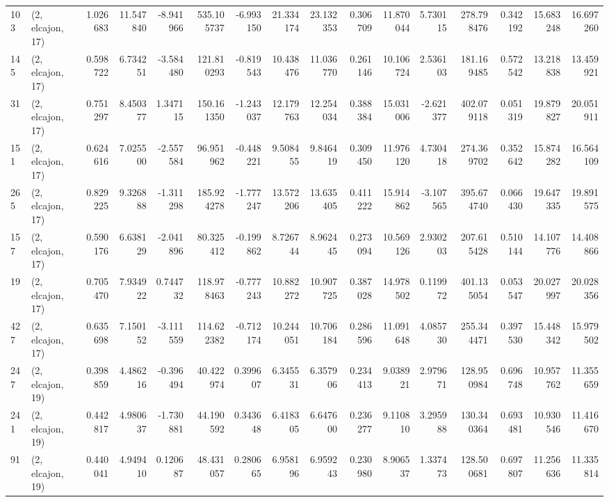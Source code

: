\begin{tabular}{llrrrrrrrrrrrrrr}
103 &  (2, elcajon, 17) &   1.026683 &  11.547840 &  -8.941966 &   535.105737 &  -6.993150 &  21.334174 &  23.132353 &  0.306709 &  11.870044 &   5.730115 &   278.798476 &   0.342192 &  15.683248 &  16.697260 \\
145 &  (2, elcajon, 17) &   0.598722 &   6.734251 &  -3.584480 &   121.810293 &  -0.819543 &  10.438476 &  11.036770 &  0.261146 &  10.106724 &   2.536103 &   181.169485 &   0.572542 &  13.218838 &  13.459921 \\
31  &  (2, elcajon, 17) &   0.751297 &   8.450377 &   1.347115 &   150.161350 &  -1.243037 &  12.179763 &  12.254034 &  0.388384 &  15.031006 &  -2.621377 &   402.079118 &   0.051319 &  19.879827 &  20.051911 \\
151 &  (2, elcajon, 17) &   0.624616 &   7.025500 &  -2.557584 &    96.951962 &  -0.448221 &   9.508455 &   9.846419 &  0.309450 &  11.976120 &   4.730418 &   274.369702 &   0.352642 &  15.874282 &  16.564109 \\
265 &  (2, elcajon, 17) &   0.829225 &   9.326888 &  -1.311298 &   185.924278 &  -1.777247 &  13.572206 &  13.635405 &  0.411222 &  15.914862 &  -3.107565 &   395.674740 &   0.066430 &  19.647335 &  19.891575 \\
157 &  (2, elcajon, 17) &   0.590176 &   6.638129 &  -2.041896 &    80.325412 &  -0.199862 &   8.726744 &   8.962445 &  0.273094 &  10.569126 &   2.930203 &   207.615428 &   0.510144 &  14.107776 &  14.408866 \\
19  &  (2, elcajon, 17) &   0.705470 &   7.934922 &   0.744732 &   118.978463 &  -0.777243 &  10.882272 &  10.907725 &  0.387028 &  14.978502 &   0.119972 &   401.135054 &   0.053547 &  20.027997 &  20.028356 \\
427 &  (2, elcajon, 17) &   0.635698 &   7.150152 &  -3.111559 &   114.622382 &  -0.712174 &  10.244051 &  10.706184 &  0.286596 &  11.091648 &   4.085730 &   255.344471 &   0.397530 &  15.448342 &  15.979502 \\
247 &  (2, elcajon, 19) &   0.398859 &   4.486216 &  -0.396494 &    40.422974 &   0.399607 &   6.345531 &   6.357906 &  0.234413 &   9.038921 &   2.979671 &   128.950984 &   0.696748 &  10.957762 &  11.355659 \\
241 &  (2, elcajon, 19) &   0.442817 &   4.980637 &  -1.730881 &    44.190592 &   0.343648 &   6.418305 &   6.647600 &  0.236277 &   9.110810 &   3.295988 &   130.340364 &   0.693481 &  10.930546 &  11.416670 \\
91  &  (2, elcajon, 19) &   0.440041 &   4.949410 &   0.120687 &    48.431057 &   0.280665 &   6.958196 &   6.959243 &  0.230980 &   8.906537 &   1.337473 &   128.500681 &   0.697807 &  11.256636 &  11.335814 \\

\end{tabular}
